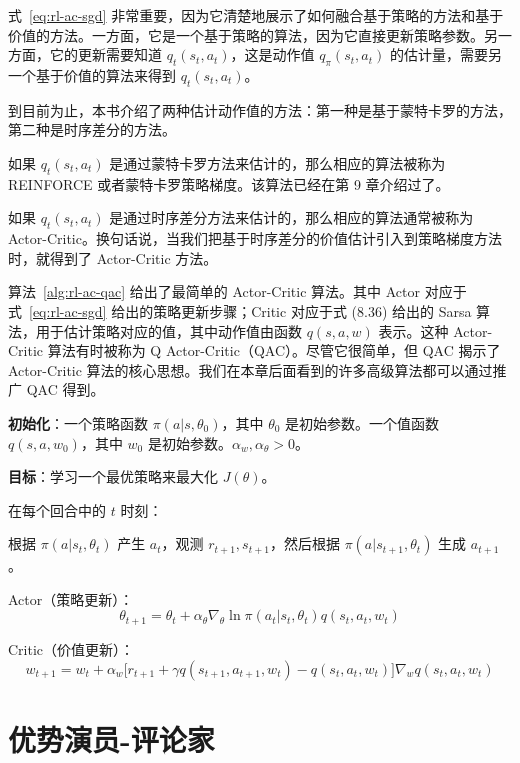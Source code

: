 式~\eqref{eq:rl-ac-sgd} 非常重要，因为它清楚地展示了如何融合基于策略的方法和基于价值的方法。一方面，它是一个基于策略的算法，因为它直接更新策略参数。另一方面，它的更新需要知道 $q_{t}(s_{t}, a_{t})$，这是动作值 $q_{\pi}(s_{t}, a_{t})$ 的估计量，需要另一个基于价值的算法来得到 $q_{t}(s_{t}, a_{t})$。

到目前为止，本书介绍了两种估计动作值的方法：第一种是基于蒙特卡罗的方法，第二种是时序差分的方法。

如果 $q_{t}(s_{t}, a_{t})$ 是通过蒙特卡罗方法来估计的，那么相应的算法被称为 REINFORCE 或者蒙特卡罗策略梯度。该算法已经在第 9 章介绍过了。

如果 $q_{t}(s_{t}, a_{t})$ 是通过时序差分方法来估计的，那么相应的算法通常被称为 Actor-Critic。换句话说，当我们把基于时序差分的价值估计引入到策略梯度方法时，就得到了 Actor-Critic 方法。

算法~\ref{alg:rl-ac-qac} 给出了最简单的 Actor-Critic 算法。其中 Actor 对应于式~\eqref{eq:rl-ac-sgd} 给出的策略更新步骤；Critic 对应于式 (8.36) 给出的 Sarsa 算法，用于估计策略对应的值，其中动作值由函数 $q(s, a, w)$ 表示。这种 Actor-Critic 算法有时被称为 Q Actor-Critic（QAC）。尽管它很简单，但 QAC 揭示了 Actor-Critic 算法的核心思想。我们在本章后面看到的许多高级算法都可以通过推广 QAC 得到。

\begin{algo}\label{alg:rl-ac-qac}
\textbf{初始化}：一个策略函数 $\pi(a | s, \theta_{0})$，其中 $\theta_{0}$ 是初始参数。一个值函数 $q(s, a, w_{0})$，其中 $w_{0}$ 是初始参数。$\alpha_{w}, \alpha_{\theta} > 0$。

\textbf{目标}：学习一个最优策略来最大化 $J(\theta)$。

在每个回合中的 $t$ 时刻：

\quad 根据 $\pi(a | s_{t}, \theta_{t})$ 产生 $a_{t}$，观测 $r_{t+1}, s_{t+1}$，然后根据 $\pi(a | s_{t+1}, \theta_{t})$ 生成 $a_{t+1}$。

\quad Actor（策略更新）：
\[
\theta_{t+1} = \theta_{t} + \alpha_{\theta} \nabla_{\theta} \ln \pi(a_{t} | s_{t}, \theta_{t}) q(s_{t}, a_{t}, w_{t})
\]

\quad Critic（价值更新）：
\[
w_{t+1} = w_{t} + \alpha_{w} \big[ r_{t+1} + \gamma q(s_{t+1}, a_{t+1}, w_{t}) - q(s_{t}, a_{t}, w_{t}) \big] \nabla_{w} q(s_{t}, a_{t}, w_{t})
\]
\end{algo}

\section{优势演员-评论家}
\label{sec:rl-ac-a2c}

